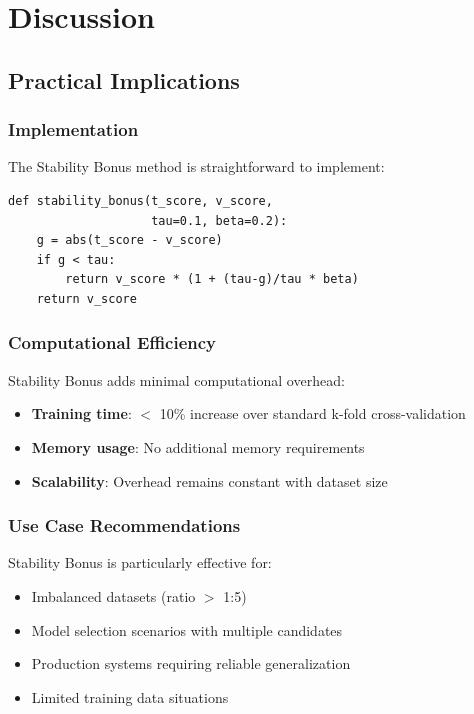 \documentclass[twoside,11pt]{article}
\begin{document}
\section{Discussion}

\subsection{Practical Implications}

\subsubsection{Implementation}
The Stability Bonus method is straightforward to implement:

\begin{verbatim}
def stability_bonus(t_score, v_score, 
                    tau=0.1, beta=0.2):
    g = abs(t_score - v_score)
    if g < tau:
        return v_score * (1 + (tau-g)/tau * beta)
    return v_score
\end{verbatim}

\subsubsection{Computational Efficiency}
Stability Bonus adds minimal computational overhead:
\begin{itemize}
    \item \textbf{Training time}: $<$ 10\% increase over standard k-fold cross-validation
    \item \textbf{Memory usage}: No additional memory requirements
    \item \textbf{Scalability}: Overhead remains constant with dataset size
\end{itemize}

\subsubsection{Use Case Recommendations}
Stability Bonus is particularly effective for:
\begin{itemize}
    \item Imbalanced datasets (ratio $>$ 1:5)
    \item Model selection scenarios with multiple candidates
    \item Production systems requiring reliable generalization
    \item Limited training data situations
\end{itemize}
\end{document}
